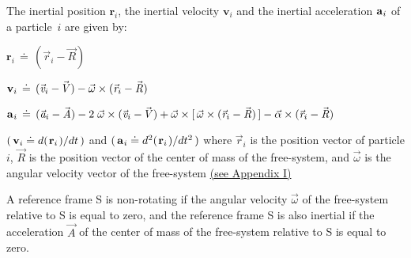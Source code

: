 \documentclass[10pt]{article}
\begin{document}
\par \bigskip \noindent The inertial position ${\mathbf{r}}_i$, the inertial velocity ${\mathbf{v}}_i$ and the inertial acceleration ${\mathbf{a}}_{\hspace{+0.045em}i}$ of a \hbox {particle $i$} are given by:

\par \bigskip\smallskip ${\mathbf{r}}_i \,\doteq\, ({\vec{\mathit{r}}}_i - {\vec{\mathit{R}}})$

\par \bigskip ${\mathbf{v}}_i \,\doteq\, ({\vec{\mathit{v}}}_i - \hspace{-0.120em}{\vec{\mathit{V}}}) - {\vec{\omega}} \times ({\vec{\mathit{r}}}_i - {\vec{\mathit{R}}})$

\par \bigskip ${\mathbf{a}}_{\hspace{+0.045em}i} \,\doteq\, ({\vec{\mathit{a}}}_i - {\vec{\mathit{A}}}) - 2 \; {\vec{\omega}} \times ({\vec{\mathit{v}}}_i - \hspace{-0.120em}{\vec{\mathit{V}}}) + {\vec{\omega}} \times [ \, {\vec{\omega}} \times ({\vec{\mathit{r}}}_i - {\vec{\mathit{R}}}) \, ] - {\vec{\alpha}} \times ({\vec{\mathit{r}}}_i - {\vec{\mathit{R}}})$

\par \bigskip\smallskip \noindent $( \, {\mathbf{v}}_i \doteq d(\hspace{+0.090em}{\mathbf{r}}_i\hspace{+0.090em})/dt \, )$ and $( \, {\mathbf{a}}_{\hspace{+0.045em}i} \doteq d^2(\hspace{+0.090em}{\mathbf{r}}_i\hspace{+0.090em})/dt^2 \, )$ where ${\vec{\mathit{r}}}_i$ is the position vector of particle $i$, ${\vec{\mathit{R}}}$ is the position vector of the center of mass of the free-system, and ${\vec{\omega}}$ is the angular velocity vector of the free-system \hyperlink{p4a1}{(\hspace{+0.120em}see Appendix I\hspace{+0.120em})}

\par \bigskip \noindent A reference frame S is non-rotating if the angular velocity ${\vec{\omega}}$ of the free-system relative to S is equal to zero, and the reference frame S is also inertial if the acceleration ${\vec{\mathit{A}}}$ of the center of mass of the free-system relative to S is equal to zero.
\end{document}
